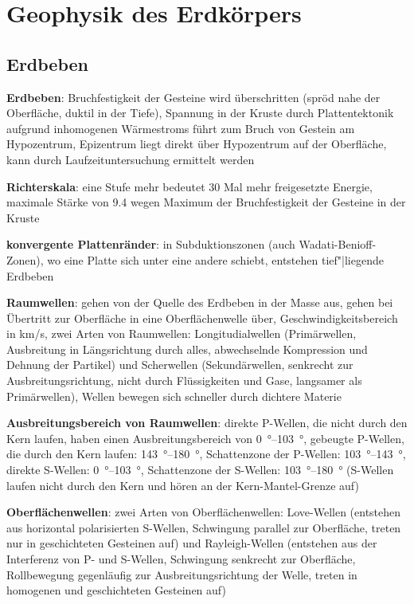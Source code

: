 \section{%
    Geophysik des Erdkörpers%
}

\subsection{%
    Erdbeben%
}

\textbf{Erdbeben}:
Bruchfestigkeit der Gesteine wird überschritten (spröd nahe der Oberfläche, duktil in der Tiefe),
Spannung in der Kruste durch Plattentektonik aufgrund inhomogenen Wärmestroms
führt zum Bruch von Gestein am Hypozentrum,
Epizentrum liegt direkt über Hypozentrum auf der Oberfläche,
kann durch Laufzeituntersuchung ermittelt werden

\textbf{Richterskala}:
eine Stufe mehr bedeutet 30 Mal mehr freigesetzte Energie,
maximale Stärke von \num{9.4} wegen Maximum der Bruchfestigkeit der Gesteine in der Kruste

\textbf{konvergente Plattenränder}:
in Subduktionszonen (auch Wadati-Benioff-Zonen), wo eine Platte sich unter eine andere schiebt,
entstehen tief"|liegende Erdbeben

\textbf{Raumwellen}:
gehen von der Quelle des Erdbeben in der Masse aus,
gehen bei Übertritt zur Oberfläche in eine Oberflächenwelle über,
Geschwindigkeitsbereich in \si{\kilo\meter/\second},
zwei Arten von Raumwellen:
Longitudialwellen (Primärwellen, Ausbreitung in Längsrichtung durch alles,
abwechselnde Kompression und Dehnung der Partikel) und
Scherwellen (Sekundärwellen, senkrecht zur Ausbreitungsrichtung,
nicht durch Flüssigkeiten und Gase, langsamer als Primärwellen),
Wellen bewegen sich schneller durch dichtere Materie

\textbf{Ausbreitungsbereich von Raumwellen}:
direkte P-Wellen, die nicht durch den Kern laufen, haben einen Ausbreitungsbereich von
\SIrange{0}{103}{\degree},
gebeugte P-Wellen, die durch den Kern laufen: \SIrange{143}{180}{\degree},
Schattenzone der P-Wellen: \SIrange{103}{143}{\degree},
direkte S-Wellen: \SIrange{0}{103}{\degree},
Schattenzone der S-Wellen: \SIrange{103}{180}{\degree}
(S-Wellen laufen nicht durch den Kern und hören an der Kern-Mantel-Grenze auf)

\textbf{Oberflächenwellen}:
zwei Arten von Oberflächenwellen:
Love-Wellen (entstehen aus horizontal polarisierten S-Wellen,
Schwingung parallel zur Oberfläche, treten nur in geschichteten Gesteinen auf) und
Rayleigh-Wellen (entstehen aus der Interferenz von P- und S-Wellen,
Schwingung senkrecht zur Oberfläche,
Rollbewegung gegenläufig zur Ausbreitungsrichtung der Welle,
treten in homogenen und geschichteten Gesteinen auf)


